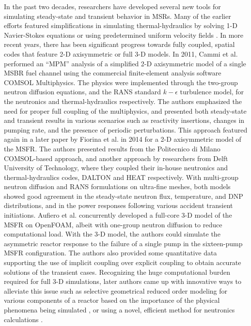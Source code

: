 In the past two decades, researchers have developed several
new tools for simulating steady-state and transient behavior in \glspl{MSR}.
Many of the earlier efforts featured simplifications in simulating
thermal-hydraulics by solving 1-D Navier-Stokes equations or using
predetermined uniform velocity fields \cite{krepel_dyn3d-msr_2007}
\cite{kophazi_development_2009}. In more recent years, there has been
significant progress towards fully coupled, spatial codes that feature
2-D axisymmetric or full 3-D models. In 2011, Cammi et al.
\cite{cammi_multi-physics_2011} performed an ``\gls{MPM}'' analysis
of a simplified 2-D axisymmetric model of a single MSBR fuel channel using
the commercial finite-element analysis software COMSOL Multiphysics. The
physics were implemented through the two-group neutron diffusion
equations, and the \gls{RANS} standard $k-\epsilon$ turbulence model, for the
neutronics and thermal-hydraulics respectively. The
authors emphasized the need for proper full coupling of the multiphysics, and
presented both steady-state and transient results in various
scenarios such as reactivity insertions, changes in pumping rate, and the
presence of periodic perturbations. This approach featured again in a later
paper by Fiorina et al. \cite{fiorina_modelling_2014} in 2014 for a 2-D
axisymmetric model of the
\gls{MSFR}. The authors presented results from the Politecnico di Milano
COMSOL-based approach, and another approach by researchers from Delft
University of Technology, where they coupled their in-house neutronics and
thermal-hydraulics codes, DALTON and HEAT respectively. With multi-group
neutron diffusion and \gls{RANS} formulations on ultra-fine meshes, both
models showed good agreement in the steady-state neutron flux, temperature,
and \gls{DNP} distributions, and in the power responses following various
accident transient initiations. Aufiero et al. \cite{aufiero_development_2014}
concurrently developed
a full-core 3-D model of the \gls{MSFR} on OpenFOAM, albeit with one-group
neutron diffusion to reduce computational load. With the 3-D model, the
authors could simulate the asymmetric reactor response to the failure of a
single pump in the sixteen-pump \gls{MSFR} configuration. The authors also
provided some quantitative data supporting the use of implicit coupling over
explicit coupling to obtain accurate solutions of the transient cases.
Recognizing the huge computational burden required for full 3-D simulations, 
later authors came up with innovative ways to alleviate this issue such as
selective geometrical reduced order modeling for various components of a
reactor based on the importance of the physical phenomena being simulated
\cite{zanetti_geometric_2015}, or using a novel, efficient method for
neutronics calculations \cite{laureau_transient_2017}.

